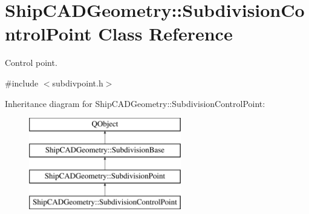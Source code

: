 \hypertarget{classShipCADGeometry_1_1SubdivisionControlPoint}{\section{Ship\-C\-A\-D\-Geometry\-:\-:Subdivision\-Control\-Point Class Reference}
\label{classShipCADGeometry_1_1SubdivisionControlPoint}
}


Control point.  




{\ttfamily \#include $<$subdivpoint.\-h$>$}

Inheritance diagram for Ship\-C\-A\-D\-Geometry\-:\-:Subdivision\-Control\-Point\-:\begin{figure}[H]
\begin{center}
\leavevmode
\includegraphics[height=4.000000cm]{classShipCADGeometry_1_1SubdivisionControlPoint}
\end{center}
\end{figure}
